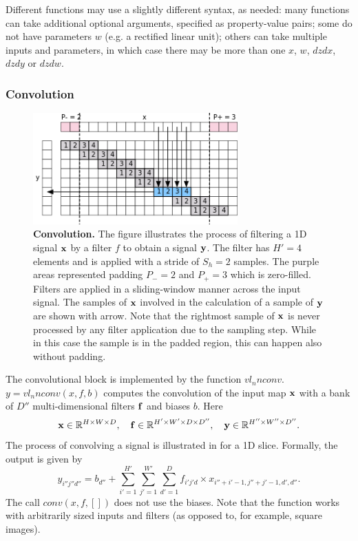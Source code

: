 Different functions may use a slightly different syntax, as needed: many functions can take additional optional arguments, specified as property-value pairs; some do not have parameters  $w$ (e.g. a rectified linear unit); others can take multiple inputs and parameters, in which case there may be more than one $x$, $w$, $dzdx$, $dzdy$ or $dzdw$.

\subsubsection{Convolution}\label{s:convolution}

\begin{figure}[H]
	\centering
	\includegraphics[width=0.7\textwidth]{figures/svg/conv}
	\caption{\textbf{Convolution.} The figure illustrates the process of filtering a 1D signal $\mathbf{x}$ by a filter $f$ to obtain a signal $\mathbf{y}$. The filter has $H'=4$ elements and is applied with a stride of $S_h =2$ samples. The purple areas represented padding $P_-=2$ and $P_+=3$ which is zero-filled. Filters are applied in a sliding-window manner across the input signal. The samples of $\mathbf{x}$ involved in the calculation of a sample of $\mathbf{y}$ are shown with arrow. Note that the rightmost sample of $\mathbf{x}$  is never processed by any filter application due to the sampling step. While in this case the sample is in the padded region, this can happen also without padding.}\label{f:conv}
\end{figure}

The convolutional block is implemented by the function $vl_nnconv$. $y=vl_nnconv(x,f,b)$ computes the convolution of the input map $\mathbf{x}$ with a bank of $D''$ multi-dimensional filters $\mathbf{f}$ and biases $b$. Here
\[
\mathbf{x}\in\mathbb{R}^{H \times W \times D}, \quad
\mathbf{f}\in\mathbb{R}^{H' \times W' \times D \times D''}, \quad
\mathbf{y}\in\mathbb{R}^{H'' \times W'' \times D''}.
\]
The process of convolving a signal is illustrated in  for a 1D slice. Formally, the output is given by
\[
y_{i''j''d''}
=
b_{d''}
+
\sum_{i'=1}^{H'}
\sum_{j'=1}^{W'}
\sum_{d'=1}^D
f_{i'j'd} \times x_{i''+i'-1,j''+j'-1,d',d''}.
\]
The call $conv(x,f,[])$ does not use the biases. Note that the function works with arbitrarily sized inputs and filters (as opposed to, for example, square images). 

